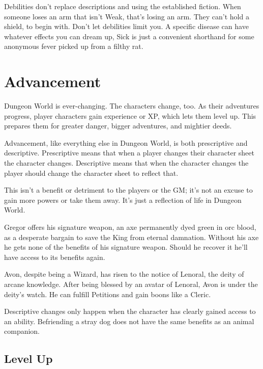  

Debilities don't replace descriptions and using the established fiction. When someone loses an arm that isn't Weak, that's losing an arm. They can't hold a shield, to begin with. Don't let debilities limit you. A specific disease can have whatever effects you can dream up, Sick is just a convenient shorthand for some anonymous fever picked up from a filthy rat.

 
\section{Advancement}   
 

Dungeon World is ever-changing. The characters change, too. As their adventures progress, player characters gain experience or XP, which lets them level up. This prepares them for greater danger, bigger adventures, and mightier deeds.

 

Advancement, like everything else in Dungeon World, is both prescriptive and descriptive. Prescriptive means that when a player changes their character sheet the character changes. Descriptive means that when the character changes the player should change the character sheet to reflect that.

 

This isn't a benefit or detriment to the players or the GM; it's not an excuse to gain more powers or take them away. It's just a reflection of life in Dungeon World.

 
\startExample
Gregor offers his signature weapon, an axe permanently dyed green in orc blood, as a desperate bargain to save the King from eternal damnation. Without his axe he gets none of the benefits of his signature weapon. Should he recover it he'll have access to its benefits again.
\stopExample
 
\startExample
Avon, despite being a Wizard, has risen to the notice of Lenoral, the deity of arcane knowledge. After being blessed by an avatar of Lenoral, Avon is under the deity's watch. He can fulfill Petitions and gain boons like a Cleric.
\stopExample
 

Descriptive changes only happen when the character has clearly gained access to an ability. Befriending a stray dog does not have the same benefits as an animal companion.

 
\subsection{Level Up}   
 


